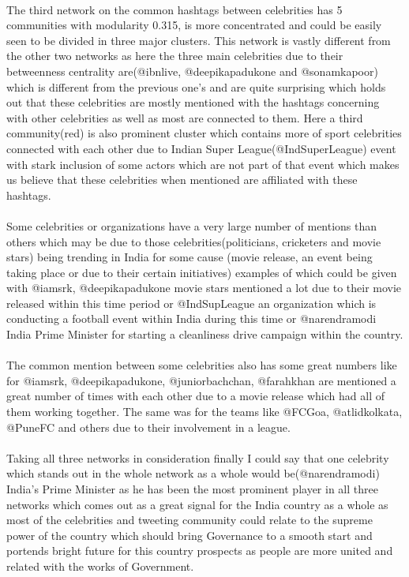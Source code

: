 \documentclass[runningheads,a4paper]{llncs}
\begin{document}
\paragraph{}
The third network on the common hashtags between celebrities has 5 communities with modularity 0.315, is more concentrated and could be easily seen to be divided in three major clusters. This network is vastly different from the other two networks as here the three main celebrities due to their betweenness centrality are(@ibnlive, @deepikapadukone and @sonamkapoor) which is different from the previous one's and are quite surprising which holds out that these celebrities are mostly mentioned with the hashtags concerning with other celebrities as well as most are connected to them. Here a third community(red) is also prominent cluster which contains more of sport celebrities connected with each other due to Indian Super League(@IndSuperLeague) event with stark inclusion of some actors which are not part of that event which makes us believe that these celebrities when mentioned are affiliated with these hashtags.

\paragraph{}
Some celebrities or organizations have a very large number of mentions than others which may be due to those celebrities(politicians, cricketers and movie stars) being trending in India for some cause (movie release, an event being taking place or due to their certain initiatives) examples of which could be given with @iamsrk, @deepikapadukone movie stars mentioned a lot due to their movie released within this time period or @IndSupLeague an organization which is conducting a football event within India during this time or @narendramodi India Prime Minister for starting a cleanliness drive campaign within the country.

\paragraph{}
The common mention between some celebrities also has some great numbers like for @iamsrk, @deepikapadukone, @juniorbachchan, @farahkhan are mentioned a great number of times with each other due to a movie release which had all of them working together. The same was for the teams like @FCGoa, @atlidkolkata, @PuneFC and others due to their involvement in a league.

\paragraph{}
Taking all three networks in consideration finally I could say that one celebrity which stands out in the whole network as a whole would be(@narendramodi) India's Prime Minister as he has been the most prominent player in all three networks which comes out as a great signal for the India country as a whole as most of the celebrities and tweeting community could relate to the supreme power of the country which should bring Governance to a smooth start and portends bright future for this country prospects as people are more united and related with the works of Government.
\end{document}
